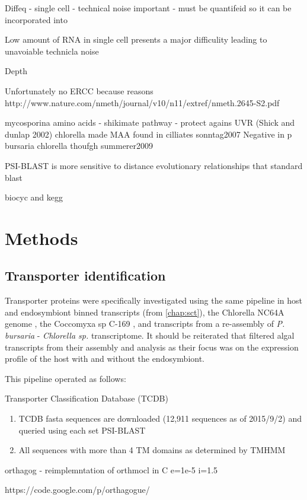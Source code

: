 Diffeq - single cell - technical noise important - must be quantifeid so it can be incorporated into 

Low amount of RNA in single cell presents a major difficulity leading to unavoiable technicla noise \citep{Brennecke2013}

Depth


Unfortunately no ERCC because reasons
http://www.nature.com/nmeth/journal/v10/n11/extref/nmeth.2645-S2.pdf




mycosporina amino acids - shikimate pathway - protect agains UVR \citep{Sommaruga2009} (Shick and dunlap 2002)
chlorella made MAA found in cilliates sonntag2007 
Negative in p bursaria chlorella thoufgh summerer2009


PSI-BLAST is more sensitive to distance evolutionary relationships that standard blast

biocyc and kegg 

\section{Methods}

\subsection{Transporter identification}

Transporter proteins were specifically investigated using the same pipeline in
host and endosymbiont binned transcripts (from \ref{chap:sct}), the Chlorella NC64A
genome \citep{Blanc2010}, the Coccomyxa sp C-169 \citep{Blanc2012}, 
and transcripts from a re-assembly of \citet{Kodama2014c} \textit{P. bursaria} 
- \textit{Chlorella sp.} transcriptome.  It should be reiterated that
\citet{Kodama2014c} filtered algal transcripts from their assembly and analysis
as their focus was on the expression profile of the host with and without 
the endosymbiont.

This pipeline operated as follows:

Transporter Classification Database (TCDB) \citep{Saier2006,Saier2009,Saier2014}



\begin{enumerate} 
    \item TCDB fasta sequences are downloaded (12,911 sequences as of 2015/9/2) and queried using each set PSI-BLAST 
    \item All sequences with more than 4 TM domains as determined by TMHMM


\end{enumerate}

orthagog - reimplemntation of orthmocl in C
e=1e-5 
i=1.5


https://code.google.com/p/orthagogue/


